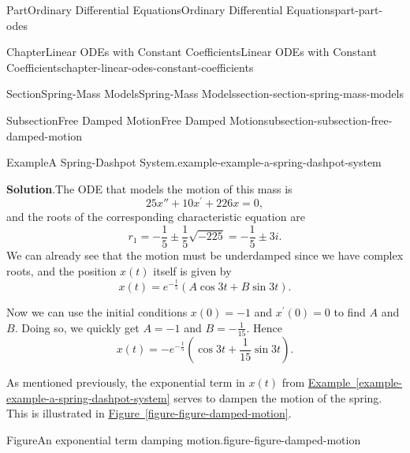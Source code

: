 \documentclass[twoside,10pt,]{book}
\newcommand{\blocktitlefont}{\relax}
\newcommand{\xreffont}{\relax}
\numberwithin{equation}{part}
\begin{document}
\begin{partptx}{Part}{Ordinary Differential Equations}{}{Ordinary Differential Equations}{}{}{part-part-odes}
\begin{chapterptx}{Chapter}{Linear ODEs with Constant Coefficients}{}{Linear ODEs with Constant Coefficients}{}{}{chapter-linear-odes-constant-coefficients}
\begin{sectionptx}{Section}{Spring-Mass Models}{}{Spring-Mass Models}{}{}{section-section-spring-mass-models}
\begin{subsectionptx}{Subsection}{Free Damped Motion}{}{Free Damped Motion}{}{}{subsection-subsection-free-damped-motion}
\begin{example}{Example}{A Spring-Dashpot System.}{example-example-a-spring-dashpot-system}
\par\smallskip%
\noindent\textbf{\blocktitlefont Solution}.\hypertarget{solution-example-a-spring-dashpot-system-c}{}\quad{}The ODE that models the motion of this mass is%
\begin{equation*}
25x'' + 10x^\prime + 226x = 0,
\end{equation*}
and the roots of the corresponding characteristic equation are%
\begin{equation*}
r_{1} = -\frac{1}{5} \pm \frac{1}{5}\sqrt{-225} = -\frac{1}{5}\pm3i.
\end{equation*}
We can already see that the motion must be underdamped since we have complex roots, and the position \(x(t)\) itself is given by%
\begin{equation*}
x(t) = e^{-\frac{t}{5}}(A\cos3t + B\sin3t).
\end{equation*}
%
\par
Now we can use the initial conditions \(x(0) = -1\) and \(x^\prime(0) = 0\) to find \(A\) and \(B\). Doing so, we quickly get \(A = -1\) and \(B = -\frac{1}{15}\). Hence%
\begin{equation*}
x(t) = -e^{-\frac{t}{5}}\left(\cos3t + \frac{1}{15}\sin3t\right).
\end{equation*}
%
\end{example}
As mentioned previously, the exponential term in \(x(t)\) from \hyperref[example-example-a-spring-dashpot-system]{Example~{\xreffont\ref{example-example-a-spring-dashpot-system}}} serves to dampen the motion of the spring. This is illustrated in \hyperref[figure-figure-damped-motion]{Figure~{\xreffont\ref{figure-figure-damped-motion}}}.%
\begin{figureptx}{Figure}{An exponential term damping motion.}{figure-figure-damped-motion}{}%
\begin{image}{0.25}{0.5}{0.25}{}%
\end{image}
\end{figureptx}
\end{subsectionptx}
\end{sectionptx}
\end{chapterptx}
\end{partptx}
\end{document}
